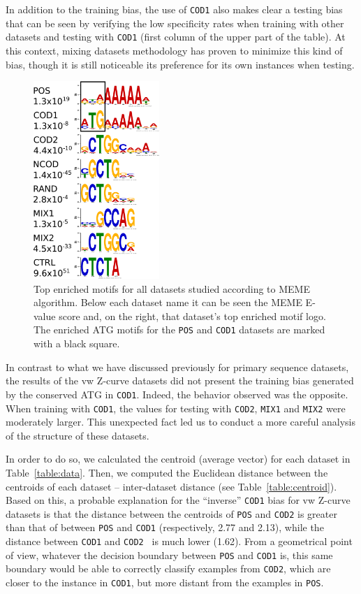 \documentclass[conference]{IEEEtran}
\begin{document}
In addition to the training bias, the use of {\tt COD1} also makes clear a testing bias that can be seen by verifying the low specificity rates when training with other datasets and testing with {\tt COD1} (first column of the upper part of the table). At this context, mixing datasets methodology has proven to minimize this kind of bias, though it is still noticeable its preference for its own instances when testing.

\begin{figure}
\vspace{0.0cm}
    \centering
    \includegraphics[width=0.425\textwidth]{Figs/MEME.pdf}
    \caption{Top enriched motifs for all datasets studied according to MEME algorithm. Below each dataset name it can be seen the MEME E-value score and, on the right, that dataset's top enriched motif logo. The enriched ATG motifs for the {\tt POS} and {\tt COD1} datasets are marked with a black square.}
    \label{fig:meme}
\end{figure}

In contrast to what we have discussed previously for primary sequence datasets, the results of the vw Z-curve datasets did not present the training bias generated by the conserved ATG in {\tt COD1}. Indeed, the behavior observed was the opposite. When training with {\tt COD1}, the values for testing with {\tt COD2}, {\tt MIX1} and {\tt MIX2} were moderately larger. This unexpected fact led us to conduct a more careful analysis of the structure of these datasets.

In order to do so, we calculated the centroid (average vector) for each dataset in Table~\ref{table:data}. Then, we computed the Euclidean distance between the centroids of each dataset -- inter-dataset distance (see Table~\ref{table:centroid}). Based on this, a probable explanation for the ``inverse'' {\tt COD1} bias for vw Z-curve datasets is that the distance between the centroids of {\tt POS} and {\tt COD2}  is greater than that of between {\tt POS} and {\tt COD1} (respectively, 2.77 and 2.13), while the distance between {\tt COD1} and {\tt COD2 } is much lower (1.62). From a geometrical point of view,  whatever the decision boundary between {\tt POS} and {\tt COD1} is, this same boundary would be able to correctly classify examples from {\tt COD2}, which are closer to the instance in {\tt COD1}, but more distant from the examples in {\tt POS}. \\
\end{document}
